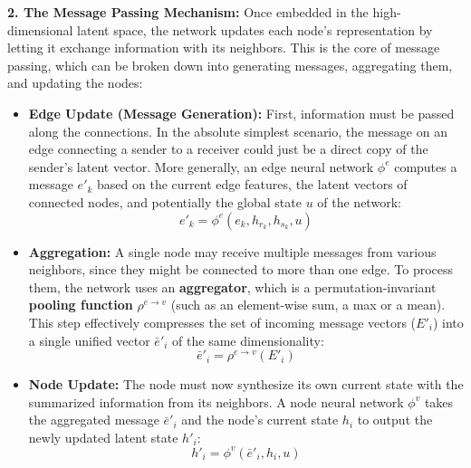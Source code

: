 \textbf{2. The Message Passing Mechanism:}
Once embedded in the high-dimensional latent space, the network updates each node's representation by letting it exchange information with its neighbors. This is the core of message passing, which can be broken down into generating messages, aggregating them, and updating the nodes:

\begin{itemize}
    \item \textbf{Edge Update (Message Generation):} First, information must be passed along the connections. In the absolute simplest scenario, the message on an edge connecting a sender to a receiver could just be a direct copy of the sender's latent vector. More generally, an edge neural network $\phi^e$ computes a message $e'_k$ based on the current edge features, the latent vectors of connected nodes, and potentially the global state $u$ of the network:
    \begin{equation}
        e'_k = \phi^e(e_k, h_{r_k}, h_{s_k}, u)
    \end{equation}
    \item \textbf{Aggregation:} A single node may receive multiple messages from various neighbors, since they might be connected to more than one edge. To process them, the network uses an \textbf{aggregator}, which is a permutation-invariant \textbf{pooling function} $\rho^{e \to v}$ (such as an element-wise sum, a max or a mean). This step effectively compresses the set of incoming message vectors ($E'_i$) into a single unified vector $\bar{e}'_i$ of the same dimensionality:
    \begin{equation}
        \bar{e}'_i = \rho^{e \to v}(E'_i)
    \end{equation}
    \item \textbf{Node Update:} The node must now synthesize its own current state with the summarized information from its neighbors. A node neural network $\phi^v$ takes the aggregated message $\bar{e}'_i$ and the node's current state $h_i$ to output the newly updated latent state $h'_i$:
    \begin{equation}\label{eq:node_update}
        h'_i = \phi^v(\bar{e}'_i, h_i, u)
    \end{equation}
\end{itemize}
